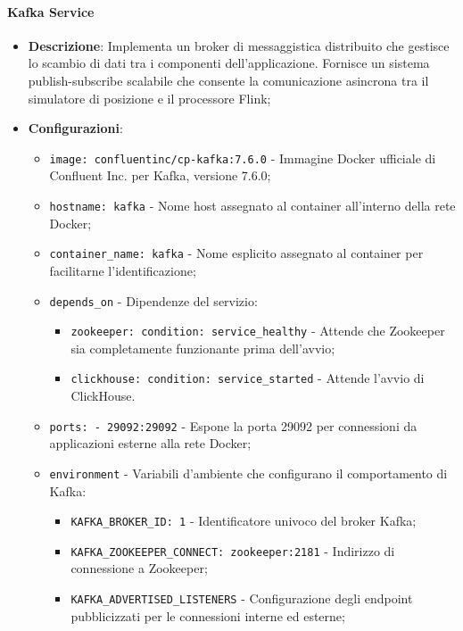 \documentclass[10pt]{article}
\begin{document}
        \paragraph{Kafka Service}
        \begin{itemize} 
        \item \textbf{Descrizione}: Implementa un broker di messaggistica distribuito che gestisce lo scambio di dati tra i componenti dell'applicazione. Fornisce un sistema publish-subscribe scalabile che consente la comunicazione asincrona tra il simulatore di posizione e il processore Flink;
        \item \textbf{Configurazioni}:
        \begin{itemize}
            \item \texttt{image: confluentinc/cp-kafka:7.6.0} - Immagine Docker ufficiale di Confluent Inc. per Kafka, versione 7.6.0;
            \item \texttt{hostname: kafka} - Nome host assegnato al container all'interno della rete Docker;
            \item \texttt{container\_name: kafka} - Nome esplicito assegnato al container per facilitarne l'identificazione;
            \item \texttt{depends\_on} - Dipendenze del servizio:
            \begin{itemize}
                \item \texttt{zookeeper: condition: service\_healthy} - Attende che Zookeeper sia completamente funzionante prima dell'avvio;
                \item \texttt{clickhouse: condition: service\_started} - Attende l'avvio di ClickHouse.
            \end{itemize}
            \item \texttt{ports: - 29092:29092} - Espone la porta 29092 per connessioni da applicazioni esterne alla rete Docker;
            \item \texttt{environment} - Variabili d'ambiente che configurano il comportamento di Kafka:
            \begin{itemize}
                \item \texttt{KAFKA\_BROKER\_ID: 1} - Identificatore univoco del broker Kafka;
                \item \texttt{KAFKA\_ZOOKEEPER\_CONNECT: zookeeper:2181} - Indirizzo di connessione a Zookeeper;
                \item \texttt{KAFKA\_ADVERTISED\_LISTENERS} - Configurazione degli endpoint pubblicizzati per le connessioni interne ed esterne;

\end{itemize}
\end{itemize}
\end{itemize}
\end{document}
